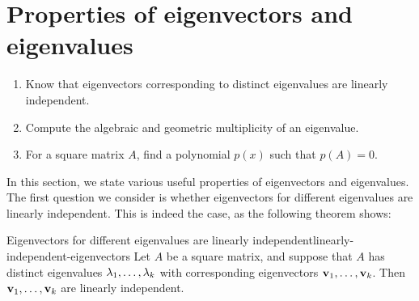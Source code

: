 \section{Properties of eigenvectors and eigenvalues}

\begin{outcome}
  \begin{enumerate}
  \item Know that eigenvectors corresponding to distinct eigenvalues
    are linearly independent.
  \item Compute the algebraic and geometric multiplicity of an
    eigenvalue.
  \item For a square matrix $A$, find a polynomial $p(x)$ such that $p(A)=0$.
  \end{enumerate}
\end{outcome}

In this section, we state various useful properties of eigenvectors
and eigenvalues. The first question we consider is whether
eigenvectors for different eigenvalues are linearly independent. This
is indeed the case, as the following theorem shows:

\begin{theorem}{Eigenvectors for different eigenvalues are linearly independent}{linearly-independent-eigenvectors}
  Let $A$ be a square matrix, and suppose that $A$ has distinct
  eigenvalues $\lambda_1,\ldots,\lambda_k$ with
  corresponding eigenvectors $\mbox{\bf v}_1,\ldots,\mbox{\bf v}_k$.
  Then $\mbox{\bf v}_1,\ldots,\mbox{\bf v}_k$ are linearly independent.
\end{theorem}

